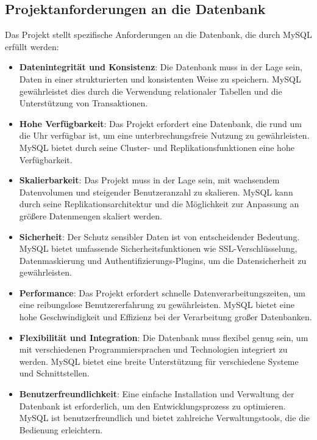 
\subsection{Projektanforderungen an die Datenbank}

Das Projekt stellt spezifische Anforderungen an die Datenbank, die durch MySQL erfüllt werden:

\begin{itemize}
	\item \textbf{Datenintegrität und Konsistenz}: Die Datenbank muss in der Lage sein, Daten in einer strukturierten und konsistenten Weise zu speichern. MySQL gewährleistet dies durch die Verwendung relationaler Tabellen und die Unterstützung von Transaktionen.
	\item \textbf{Hohe Verfügbarkeit}: Das Projekt erfordert eine Datenbank, die rund um die Uhr verfügbar ist, um eine unterbrechungsfreie Nutzung zu gewährleisten. MySQL bietet durch seine Cluster- und Replikationsfunktionen eine hohe Verfügbarkeit.
	\item \textbf{Skalierbarkeit}: Das Projekt muss in der Lage sein, mit wachsendem Datenvolumen und steigender Benutzeranzahl zu skalieren. MySQL kann durch seine Replikationsarchitektur und die Möglichkeit zur Anpassung an größere Datenmengen skaliert werden.
	\item \textbf{Sicherheit}: Der Schutz sensibler Daten ist von entscheidender Bedeutung. MySQL bietet umfassende Sicherheitsfunktionen wie SSL-Verschlüsselung, Datenmaskierung und Authentifizierungs-Plugins, um die Datensicherheit zu gewährleisten.
	\item \textbf{Performance}: Das Projekt erfordert schnelle Datenverarbeitungszeiten, um eine reibungslose Benutzererfahrung zu gewährleisten. MySQL bietet eine hohe Geschwindigkeit und Effizienz bei der Verarbeitung großer Datenbanken.
	\item \textbf{Flexibilität und Integration}: Die Datenbank muss flexibel genug sein, um mit verschiedenen Programmiersprachen und Technologien integriert zu werden. MySQL bietet eine breite Unterstützung für verschiedene Systeme und Schnittstellen.
	\item \textbf{Benutzerfreundlichkeit}: Eine einfache Installation und Verwaltung der Datenbank ist erforderlich, um den Entwicklungsprozess zu optimieren. MySQL ist benutzerfreundlich und bietet zahlreiche Verwaltungstools, die die Bedienung erleichtern.
\end{itemize}

